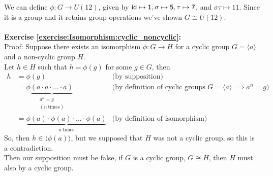 We can define $\phi:G \rightarrow U(12)$,  given by  $\sf{id} \mapsto 1,  \sigma \mapsto 5, \tau \mapsto 7$, and $\sigma\tau \mapsto 11$. Since it is a group and it retains group operations we've shown $G \cong U(12)$.
\\
\\

\noindent\textbf{Exercise \ref{exercise:Isomorphism:cyclic_noncyclic}:}
\\
Proof: Suppose there exists an isomorphism $\phi: G \rightarrow H$ for a cyclic group $G = \langle a \rangle$ and a non-cyclic group $H$.
\\
Let $h \in H$ such that $h = \phi(g)$ for some $g \in G$, then
\begin{align*}
h &= \phi(g) &\text{(by supposition)}
\\
&= \phi \underbrace{(a \cdot a \cdot \dotsc \cdot a)}_{\substack{a^n = g \\ (n\  \text{times})}} &\text{(by definition of cyclic groups\ } G = \langle a \rangle \implies a^n = g)
\\
&= \underbrace{\phi(a) \cdot \phi(a) \cdot \dotsc \cdot  \phi(a)}_{n\ \text{times}} &\text{(by definition of isomorphism)}
\end{align*}
So, then $h \in \langle \phi(a) \rangle$, but we supposed that $H$ was not a cyclic group, so this is a contradiction.
\\
Then our supposition must be false, if $G$ is a cyclic group, $G \cong H$, then $H$ must also by a cyclic group.
\\
\\

